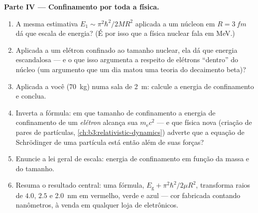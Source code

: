 \begin{problem}
\medskip\noindent\textbf{Parte IV --- Confinamento por toda a física.}
\begin{enumerate}[resume]
  \item A mesma estimativa $E_1 \sim \pi^2\hbar^2/2MR^2$ aplicada a um
        núcleon em $R = \qty{3}{fm}$ dá que escala de energia? (É por
        isso que a física nuclear fala em MeV.)
  \item Aplicada a um elétron confinado ao tamanho nuclear, ela dá que
        energia escandalosa --- e o que isso argumenta a respeito de
        elétrons ``dentro'' do núcleo (um argumento que um dia matou
        uma teoria do decaimento beta)?
  \item Aplicada a você (\qty{70}{kg}) numa sala de \qty{2}{m}:
        calcule a energia de confinamento e conclua.
  \item Inverta a fórmula: em que tamanho de confinamento a energia de
        confinamento de um \emph{elétron} alcança sua  $m_{\text{e}}c^2$ --- e que física nova (criação de
        pares de partículas, \cref{ch:b3:relativistic-dynamics})
        adverte que a equação de Schrödinger de uma partícula está
        então além de suas forças?
  \item Enuncie a lei geral de escala: energia de confinamento em
        função da massa e do tamanho.
  \item Resuma o resultado central: uma fórmula,
        $E_{\text{g}} + \pi^2\hbar^2/2\mu R^2$, transforma raios de
        $4.0$, $2.5$ e \qty{2.0}{nm} em vermelho, verde e azul --- cor
        fabricada contando nanômetros, à venda em qualquer loja de
        eletrônicos.
\end{enumerate}
\end{problem}
